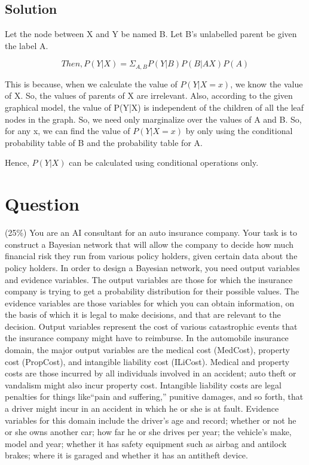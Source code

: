 \documentclass[10pt]{article}
\begin{document}
\subsection{Solution}

Let the node between X and Y be named B. Let B's unlabelled parent be given the label A.

\begin{equation}
Then, P(Y|X) = \Sigma_{A,B}P(Y|B)P(B|AX)P(A)
\end{equation}

This is because, when we calculate the value of $P(Y|X=x)$, we know the value of X. So, the values of parents of X are irrelevant. Also, according to the given graphical model, the value of P(Y|X) is independent of the children of all the leaf nodes in the graph. So, we need only marginalize over the values of A and B. So, for any x, we can find the value of $P(Y|X=x)$ by only using the conditional probability table of B and the probability table for A.

Hence, $P(Y|X)$ can be calculated using conditional operations only.

\section{Question}
 (25\%) You are an AI consultant for an auto insurance company. Your task is to construct a Bayesian network that will allow the company to decide how much financial risk they run from various policy holders, given certain data about the policy holders. In order to design a Bayesian network, you need output variables and evidence variables. The output variables are those for which the insurance company is trying to get a probability distribution for their possible values. The evidence variables are those variables for which you can obtain information, on the basis of which it is legal to make decisions, and that are relevant to the decision. Output variables represent the cost of various catastrophic events that the insurance company might have to reimburse. In the automobile insurance domain, the major output variables are the medical cost (MedCost), property cost (PropCost), and intangible liability cost (ILiCost). Medical and property costs are those incurred by all individuals involved in an accident; auto theft or vandalism might also incur property cost. Intangible liability costs are legal penalties for things like``pain and suffering,'' punitive damages, and so forth, that a driver might incur in an accident in which he or she is at fault. Evidence variables for this domain include the driver's age and record; whether or not he or she owns another car; how far he or she drives per year; the vehicle's make, model and year; whether it has safety equipment such as airbag and antilock brakes; where it is garaged and whether it has an antitheft device.
\end{document}
